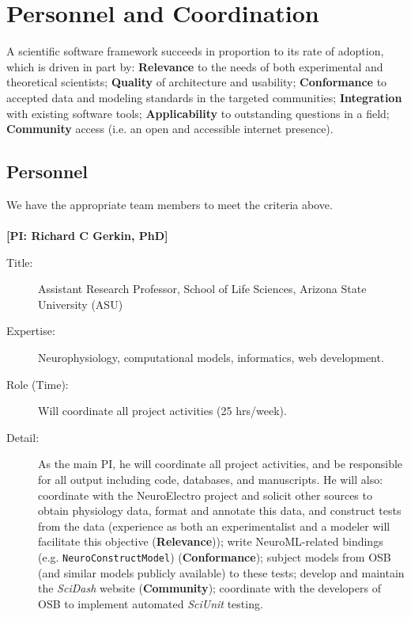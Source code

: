 \documentclass[11pt,letterpaper]{article}
\begin{document}
\section{Personnel and Coordination}
\renewcommand{\theenumi}{\alph{enumi}}
A scientific software framework succeeds in proportion to its rate of adoption, which is driven in part by: \textbf{Relevance} to the needs of both experimental and theoretical scientists;
\textbf{Quality} of architecture and usability; \textbf{Conformance} to accepted data and modeling standards in the targeted communities; \textbf{Integration} with existing software tools; \textbf{Applicability} to outstanding questions in a field; \textbf{Community} access (i.e. an open and accessible internet presence).

\subsection{Personnel}
We have the appropriate team members to meet the criteria above. 
\\
\\
\textbf{[PI: Richard C Gerkin, PhD]}
\begin{description}
\item[Title:] Assistant Research Professor, School of Life Sciences, Arizona State University (ASU)
\item[Expertise:] Neurophysiology, computational models, informatics, web development.   
\item[Role (Time):] Will coordinate all project activities (25 hrs/week).  
\item[Detail:] As the main PI, he will coordinate all project activities, and be responsible for all output including code, databases, and manuscripts. He will also: coordinate with the NeuroElectro project and solicit other sources to obtain physiology data, format and annotate this data, and construct tests from the data (experience as both an experimentalist and a modeler will facilitate this objective (\textbf{Relevance})); write NeuroML-related bindings (e.g. \verb|NeuroConstructModel|) (\textbf{Conformance}); subject models from OSB (and similar models publicly available) to these tests; develop and maintain the \textit{SciDash} website (\textbf{Community}); coordinate with the developers of OSB to implement automated \textit{SciUnit} testing.
\end{description}
\end{document}

